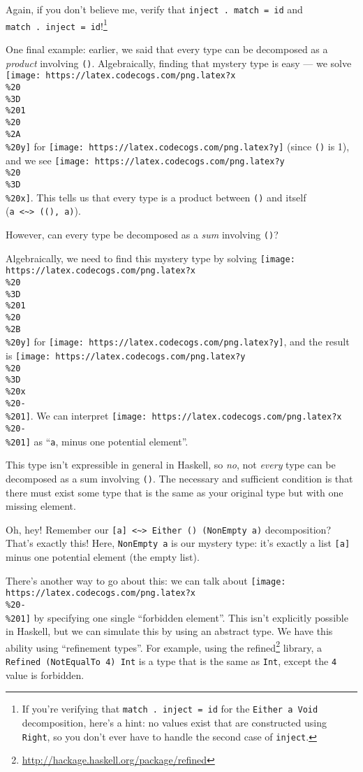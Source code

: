 \documentclass[]{article}
\renewcommand{\href}[2]{#2\footnote{\url{#1}}}
\begin{document}
Again, if you don't believe me, verify that \texttt{inject\ .\ match\ =\ id} and
\texttt{match\ .\ inject\ =\ id}!\footnote{If you're verifying that
  \texttt{match\ .\ inject\ =\ id} for the \texttt{Either\ a\ Void}
  decomposition, here's a hint: no values exist that are constructed using
  \texttt{Right}, so you don't ever have to handle the second case of
  \texttt{inject}.}

One final example: earlier, we said that every type can be decomposed as a
\emph{product} involving \texttt{()}. Algebraically, finding that mystery type
is easy --- we solve
\texttt{[image: https://latex.codecogs.com/png.latex?x\\\%20\\\%3D\\\%201\\\%20\\\%2A\\\%20y]}
for \texttt{[image: https://latex.codecogs.com/png.latex?y]} (since \texttt{()}
is 1), and we see
\texttt{[image: https://latex.codecogs.com/png.latex?y\\\%20\\\%3D\\\%20x]}. This
tells us that every type is a product between \texttt{()} and itself
(\texttt{a\ \textless{}\textasciitilde{}\textgreater{}\ ((),\ a)}).

However, can every type be decomposed as a \emph{sum} involving \texttt{()}?

Algebraically, we need to find this mystery type by solving
\texttt{[image: https://latex.codecogs.com/png.latex?x\\\%20\\\%3D\\\%201\\\%20\\\%2B\\\%20y]}
for \texttt{[image: https://latex.codecogs.com/png.latex?y]}, and the result is
\texttt{[image: https://latex.codecogs.com/png.latex?y\\\%20\\\%3D\\\%20x\\\%20-\\\%201]}.
We can interpret
\texttt{[image: https://latex.codecogs.com/png.latex?x\\\%20-\\\%201]} as
``\texttt{a}, minus one potential element''.

This type isn't expressible in general in Haskell, so \emph{no}, not
\emph{every} type can be decomposed as a sum involving \texttt{()}. The
necessary and sufficient condition is that there must exist some type that is
the same as your original type but with one missing element.

Oh, hey! Remember our
\texttt{{[}a{]}\ \textless{}\textasciitilde{}\textgreater{}\ Either\ ()\ (NonEmpty\ a)}
decomposition? That's exactly this! Here, \texttt{NonEmpty\ a} is our mystery
type: it's exactly a list \texttt{{[}a{]}} minus one potential element (the
empty list).

There's another way to go about this: we can talk about
\texttt{[image: https://latex.codecogs.com/png.latex?x\\\%20-\\\%201]} by specifying
one single ``forbidden element''. This isn't explicitly possible in Haskell, but
we can simulate this by using an abstract type. We have this ability using
``refinement types''. For example, using the
\href{http://hackage.haskell.org/package/refined}{refined} library, a
\texttt{Refined\ (NotEqualTo\ 4)\ Int} is a type that is the same as
\texttt{Int}, except the \texttt{4} value is forbidden.
\end{document}
